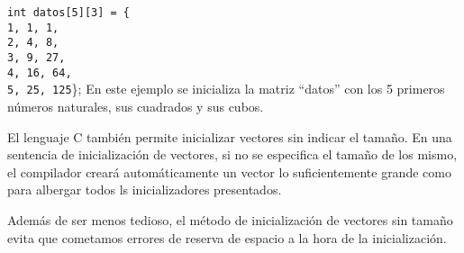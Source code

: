 {\begin{Ejemplo}
\texttt{int datos[5][3] = \{}\\
\texttt{1, 1, 1,}\\
\texttt{2, 4, 8,}\\
\texttt{3, 9, 27,}\\
\texttt{4, 16, 64,}\\
\texttt{5, 25, 125}\};
\Explicacion
En este ejemplo se inicializa la matriz ``datos'' con los 5 primeros números naturales, sus cuadrados y sus cubos.
\end{Ejemplo}
El lenguaje C también permite inicializar vectores sin indicar el tamaño. En una sentencia de inicialización de vectores, si no se especifica el tamaño de los mismo, el compilador creará automáticamente un vector lo suficientemente grande como para albergar todos ls inicializadores presentados.

Además de ser menos tedioso, el método de inicialización de vectores sin tamaño evita que cometamos errores de reserva de espacio a la hora de la inicialización.
}

